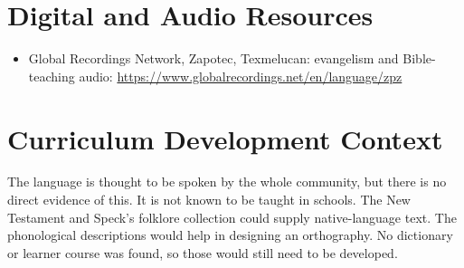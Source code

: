 \documentclass[12pt]{article}
\begin{document}
\section{Digital and Audio Resources}
\begin{itemize}
\item Global Recordings Network, Zapotec, Texmelucan: evangelism and Bible-teaching audio: \url{https://www.globalrecordings.net/en/language/zpz}
\end{itemize}

\section{Curriculum Development Context}
The language is thought to be spoken by the whole community, but there is no direct evidence of this. It is not known to be taught in schools. The New Testament and Speck's folklore collection could supply native-language text. The phonological descriptions would help in designing an orthography. No dictionary or learner course was found, so those would still need to be developed.
\end{document}
